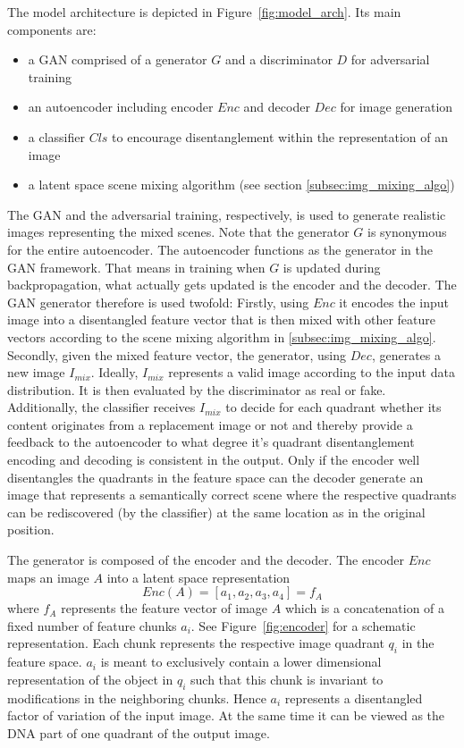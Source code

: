 \documentclass[12pt,a4paper]{article}
\begin{document}
The model architecture is depicted in Figure~\ref{fig:model_arch}. Its main components are:

\begin{itemize}
   \item a GAN comprised of a generator $G$ and a discriminator $D$ for adversarial training
   \item an autoencoder including encoder $Enc$ and decoder $Dec$ for image generation
   \item a classifier $Cls$ to encourage disentanglement within the representation of an image
   \item a latent space scene mixing algorithm (see section \ref{subsec:img_mixing_algo})
\end{itemize}
 
The GAN and the adversarial training, respectively, is used to generate realistic images representing the mixed scenes. Note that the generator $G$ is synonymous for the entire autoencoder. The autoencoder functions as the generator in the GAN framework. That means in training when $G$ is updated during backpropagation, what actually gets updated is the encoder and the decoder. The GAN generator therefore is used twofold: Firstly, using $Enc$ it encodes the input image into a disentangled feature vector that is then mixed with other feature vectors according to the scene mixing algorithm in \ref{subsec:img_mixing_algo}. Secondly, given the mixed feature vector, the generator, using $Dec$, generates a new image $I_{mix}$. Ideally, $I_{mix}$ represents a valid image according to the input data distribution. It is then evaluated by the discriminator as real or fake. Additionally, the classifier receives $I_{mix}$ to decide for each quadrant whether its content originates from a replacement image or not and thereby provide a feedback to the autoencoder to what degree it's quadrant disentanglement encoding and decoding is consistent in the output. Only if the encoder well disentangles the quadrants in the feature space can the decoder generate an image that represents a semantically correct scene where the respective quadrants can be rediscovered (by the classifier) at the same location as in the original position. 

The generator is composed of the encoder and the decoder. The encoder $Enc$ maps an image $A$ into a latent space representation
\begin{equation} \label{eq:2}
    Enc(A) = [a_1, a_2, a_3, a_4] = f_A
\end{equation}
where $f_A$ represents the feature vector of image $A$ which is a concatenation of a fixed number of feature chunks $a_i$. See Figure~\ref{fig:encoder} for a schematic representation. Each chunk represents the respective image quadrant $q_i$ in the feature space. $a_i$ is meant to exclusively contain a lower dimensional representation of the object in $q_i$ such that this chunk is invariant to modifications in the neighboring chunks. Hence $a_i$ represents a disentangled factor of variation of the input image. At the same time it can be viewed as the DNA part of one quadrant of the output image.
\end{document}
